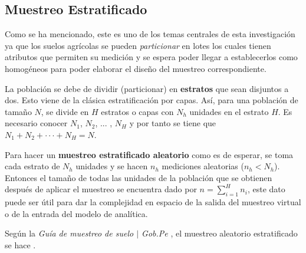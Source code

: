 %
%

\subsection{Muestreo Estratificado}

Como se ha mencionado, este es uno de los temas centrales de esta investigación ya que los suelos agrícolas se pueden \textit{particionar} en lotes los cuales tienen atributos que permiten su medición y se espera poder llegar a establecerlos como homogéneos para poder elaborar el diseño del muestreo correspondiente.

\bigbreak

La población se debe de dividir (particionar) en \textbf{estratos} que sean disjuntos a dos. Esto viene de la clásica estratificación por capas. Así, para una población de tamaño $N$, se divide en $H$ estratos o capas con $N_h$ unidades en el estrato $H$. Es necesario conocer $N_1$, $N_2$, ... , $N_H$ y por tanto se tiene que $N_1 + N_2 + \cdot \cdot \cdot + N_H = N$.

\bigbreak

Para hacer un \textbf{muestreo estratificado aleatorio} como es de esperar, se toma cada estrato de $N_h$ unidades y se hacen $n_h$ mediciones aleatorias ($n_h < N_h$). Entonces el tamaño de todas las unidades de la población que se obtienen después de aplicar el muestreo se encuentra dado por $n = \sum \limits_{i=1}^H n_i$, este dato puede ser útil para dar la complejidad en espacio de la salida del muestreo virtual o de la entrada del modelo de analítica.

\bigbreak

Según la \textit{Guía de muestreo de suelo $\mid$ Gob.Pe} \cite{gobpe-ministerio-del-ambiente-2014}, el muestreo aleatorio estratificado se hace .

